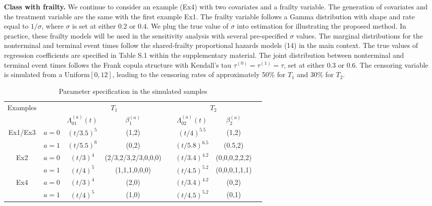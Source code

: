 \documentclass[12pt]{article}
\begin{document}
\textbf{Class with frailty.} 
We continue to consider an example (Ex4) with two covariates and a frailty variable. The generation of covariates and the treatment variable are the same with the first example Ex1. The frailty variable follows a Gamma distribution with shape and rate equal to $1/\sigma$, where $\sigma$ is set at either 0.2 or 0.4. We plug the true value of $\sigma$ into estimation for illustrating the proposed method. In practice, these frailty models will be used in the sensitivity analysis with several pre-specified $\sigma$ values. The marginal distributions for the nonterminal and terminal event times follow the shared-frailty proportional hazards models (14) in the main context. %
The true values of regression coefficients are specified in Table S.1 within the supplementary material. The joint distribution between nonterminal and terminal event times follows the Frank copula structure with Kendall's tau $\tau^{(0)}=\tau^{(1)}=\tau$, set at either 0.3 or 0.6. The censoring variable is simulated from a Uniform$[0, 12]$, leading to the censoring rates of approximately 50$\%$ for $T_1$ and 30$\%$ for $T_2$. 

\begin{table}[h]
    \centering
        \caption{Parameter specification in the simulated samples }
    \label{tab:sim_param}
    \begin{tabular}{cccccccc}
    \hline \hline
    \multicolumn{1}{l}{Examples}&\multicolumn{1}{c}{}&\multicolumn{2}{c}{$T_1$}&&\multicolumn{2}{c}{$T_2$}\\
    \cline{3-4}\cline{6-7}
    &&$\Lambda_{01}^{(a)}(t)$& $\beta_{1}^{(a)}$&&$\Lambda_{02}^{(a)}(t)$&$\beta_{2}^{(a)}$\\
     \hline
    Ex1/Ex3& $a=0$     &  $(t/3.5)^5$& (1,2) && $(t/4)^{5.5}$ &(1,2) \\
    &$a=1$     &  $(t/5.5)^6$ & (0,2) && $(t/5.8)^{6.5}$ &(0.5,2) \\
    \hline
    Ex2& $a=0$     &  $(t/3)^4$& (2/3,2/3,2/3,0,0,0) && $(t/3.4)^{4.2}$ &(0,0,0,2,2,2) \\
    &$a=1$     &  $(t/4)^5$ & (1,1,1,0,0,0) && $(t/4.5)^{5.2}$ &(0,0,0,1,1,1) \\  
    \hline
    Ex4& $a=0$     &  $(t/3)^4$& (2,0) && $(t/3.4)^{4.2}$ &(0,2) \\
    &$a=1$     &  $(t/4)^5$ & (1,0) && $(t/4.5)^{5.2}$ &(0,1) \\                 
    \hline
    \end{tabular}
\end{table}
\end{document}
